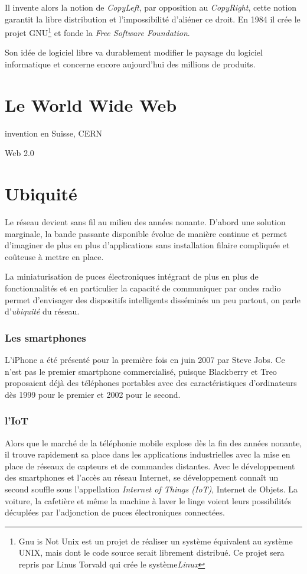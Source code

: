 \documentclass[a4paper,11pt]{book}
\begin{document}
Il invente alors la notion de \textit{CopyLeft}, par opposition au \textit{CopyRight}, cette notion garantit la libre distribution et l'impossibilité d'aliéner ce droit. En 1984 il crée le projet GNU\footnote{Gnu is Not Unix est un projet de réaliser un système équivalent au système UNIX, mais dont le code source serait librement distribué. Ce projet sera repris par Linus Torvald qui crée le système\textit{Linux}} et fonde la \textit{Free Software Foundation}.

Son idée de logiciel libre va durablement modifier le paysage du logiciel informatique et concerne encore aujourd'hui des millions de produits.

\section{Le World Wide Web}
invention en Suisse, CERN

Web 2.0 

\section{Ubiquité}
Le réseau devient sans fil au milieu des années nonante. D'abord une solution marginale, la bande passante disponible évolue de manière continue et permet d'imaginer de plus en plus d'applications sans installation filaire compliquée et coûteuse à mettre en place.

La miniaturisation de puces électroniques intégrant de plus en plus de fonctionnalités et en particulier la capacité de communiquer par ondes radio permet d'envisager des dispositifs intelligents disséminés un peu partout, on parle d'\textit{ubiquité} du réseau.

\subsubsection{Les smartphones}
L'iPhone a été présenté pour la première fois en juin 2007 par Steve Jobs. Ce n'est pas le premier smartphone commercialisé, puisque Blackberry et Treo proposaient déjà des téléphones portables avec des caractéristiques d'ordinateurs dès 1999 pour le premier et 2002 pour le second.

\subsubsection{l'IoT}
Alors que le marché de la téléphonie mobile explose dès la fin des années nonante, il trouve rapidement sa place dans les applications industrielles avec la mise en place de réseaux de capteurs et de commandes distantes. Avec le développement des smartphones et l'accès au réseau Internet, se développement connaît un second souffle sous l'appellation \textit{Internet of Things (IoT)}, Internet de Objets. La voiture, la cafetière et même la machine à laver le linge voient leurs possibilités décuplées par l'adjonction de puces électroniques connectées.
\end{document}
